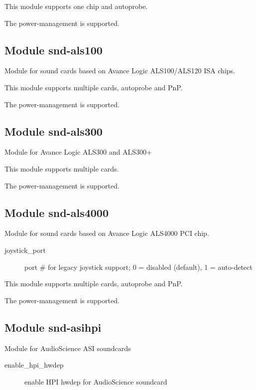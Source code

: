 \documentclass[a4paper,8pt,english]{sphinxmanual}
\begin{document}
This module supports one chip and autoprobe.

The power-management is supported.


\subsection{Module snd-als100}
\label{sound/alsa-configuration:module-snd-als100}
Module for sound cards based on Avance Logic ALS100/ALS120 ISA chips.

This module supports multiple cards, autoprobe and PnP.

The power-management is supported.


\subsection{Module snd-als300}
\label{sound/alsa-configuration:module-snd-als300}
Module for Avance Logic ALS300 and ALS300+

This module supports multiple cards.

The power-management is supported.


\subsection{Module snd-als4000}
\label{sound/alsa-configuration:module-snd-als4000}
Module for sound cards based on Avance Logic ALS4000 PCI chip.
\begin{description}
\item[{joystick\_port}] \leavevmode
port \# for legacy joystick support;
0 = disabled (default), 1 = auto-detect

\end{description}

This module supports multiple cards, autoprobe and PnP.

The power-management is supported.


\subsection{Module snd-asihpi}
\label{sound/alsa-configuration:module-snd-asihpi}
Module for AudioScience ASI soundcards
\begin{description}
\item[{enable\_hpi\_hwdep}] \leavevmode
enable HPI hwdep for AudioScience soundcard

\end{description}
\end{document}

